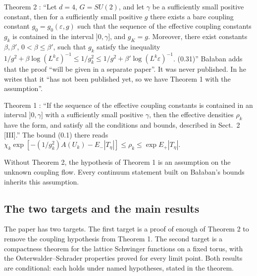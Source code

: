 Theorem 2 \cite[p.~259]{balaban109}: ``Let $d = 4$, $G = SU(2)$, and let $\gamma$ be a sufficiently small positive constant, then for a sufficiently small positive $g$ there exists a bare coupling constant $g_0 = g_0(\varepsilon, g)$ such that the sequence of the effective coupling constants $g_k$ is contained in the interval $]0, \gamma]$, and $g_K = g$. Moreover, there exist constants $\beta, \beta'$, $0 < \beta \le \beta'$, such that $g_k$ satisfy the inequality $1/g^2 + \beta \log(L^k\varepsilon)^{-1} \le 1/g_k^2 \le 1/g^2 + \beta' \log(L^k\varepsilon)^{-1}$. (0.31)'' Ba{\l}aban adds that the proof ``will be given in a separate paper''. It was never published. In \cite[p.~355]{balaban122b} he writes that it ``has not been published yet, so we have Theorem 1 with the assumption''.

Theorem 1 \cite[p.~355]{balaban122b}: ``If the sequence of the effective coupling constants is contained in an interval $]0, \gamma]$ with a sufficiently small positive $\gamma$, then the effective densities $\rho_k$ have the form, and satisfy all the conditions and bounds, described in Sect.\ 2 [III].'' The bound (0.1) there reads $\chi_k \exp[-(1/g_k^2)A(U_k) - E_-|T_\eta|] \le \rho_k \le \exp E_+|T_\eta|$.

Without Theorem 2, the hypothesis of Theorem 1 is an assumption on the unknown coupling flow. Every continuum statement built on Ba{\l}aban's bounds inherits this assumption.

\subsection{The two targets and the main results}\label{sec:main}

The paper has two targets. The first target is a proof of enough of Theorem 2 to remove the coupling hypothesis from Theorem 1. The second target is a compactness theorem for the lattice Schwinger functions on a fixed torus, with the Osterwalder--Schrader properties proved for every limit point. Both results are conditional: each holds under named hypotheses, stated in the theorem.

